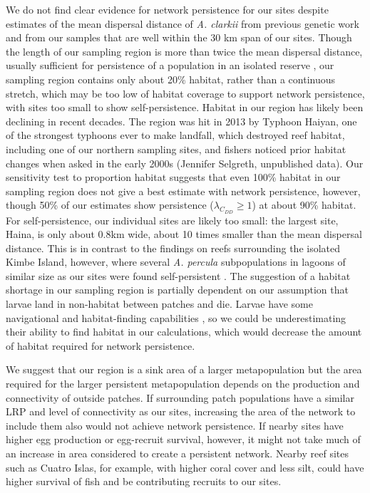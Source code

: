 \documentclass[12pt, oneside]{article}   	%
\begin{document}
We do not find clear evidence for network persistence for our sites despite estimates of the mean dispersal distance of \textit{A. clarkii} from previous genetic work \citep[11 km,][]{pinsky2010using} and from our samples \citep[8.2 km,][]{catalanoInPrepconnectivity} that are well within the 30 km span of our sites. Though the length of our sampling region is more than twice the mean dispersal distance, usually sufficient for persistence of a population in an isolated reserve \citep[e.g.,][]{lockwood2002effects}, our sampling region contains only about 20\% habitat, rather than a continuous stretch, which may be too low of habitat coverage to support network persistence, with sites too small to show self-persistence. Habitat in our region has likely been declining in recent decades. The region was hit in 2013 by Typhoon Haiyan, one of the strongest typhoons ever to make landfall, which destroyed reef habitat, including one of our northern sampling sites, and fishers noticed prior habitat changes when asked in the early 2000s (Jennifer Selgreth, unpublished data). Our sensitivity test to proportion habitat suggests that even 100\% habitat in our sampling region does not give a best estimate with network persistence, however, though 50\% of our estimates show persistence ($\lambda_{C_{DD}} \geq 1$) at about 90\% habitat. For self-persistence, our individual sites are likely too small: the largest site, Haina, is only about 0.8km wide, about 10 times smaller than the mean dispersal distance. This is in contrast to the findings on reefs surrounding the isolated Kimbe Island, however, where several \textit{A. percula} subpopulations in lagoons of similar size as our sites were found self-persistent \citep{salles_coral_2015}.  The suggestion of a habitat shortage in our sampling region is partially dependent on our assumption that larvae land in non-habitat between patches and die. Larvae have some navigational and habitat-finding capabilities \citep[e.g.][]{elliott1995host, fisher2005swimming}, so we could be underestimating their ability to find habitat in our calculations, which would decrease the amount of habitat required for network persistence. %

We suggest that our region is a sink area of a larger metapopulation but the area required for the larger persistent metapopulation depends on the production and connectivity of outside patches. If surrounding patch populations have a similar LRP and level of connectivity as our sites, increasing the area of the network to include them also would not achieve network persistence. If nearby sites have higher egg production or egg-recruit survival, however, it might not take much of an increase in area considered to create a persistent network. Nearby reef sites such as Cuatro Islas, for example, with higher coral cover and less silt, could have higher survival of fish and be contributing recruits to our sites. %
\end{document}

